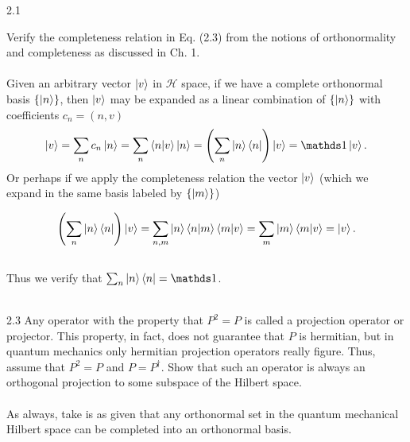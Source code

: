 \documentclass[10pt,letterpaper]{article}
\begin{document}
	\item[2.1]
	
	Verify the completeness relation in Eq. (2.3) from the notions of orthonormality and completeness as discussed in 
	Ch. 1.\\ \\
	
	Given an arbitrary vector $\ket v$ in $\mathscr H$ space, if we have a complete orthonormal basis  $\{ \ket n\}$, 
	then $\ket v$ may be expanded as a linear combination of  $\{ \ket n\}$ with coefficients $c_n = (n,v)$
	\[
		\ket v = \sum_n c_n \ket n = \sum_n \braket{n|v}\ket n =\plr{ \sum_n {\ket n\bra n}}\ket v = \mathds 1 \ket v.
	\]
	 Or perhaps if we apply the completeness relation the vector $\ket v$ (which we expand in the same basis 
	 labeled by $\{\ket m\}$)
	 
	\[
		\left(\sum_n \ket n\bra n\right) \ket v = \sum_{n,m} \ket n \braket{n|m}\braket{m|v} = \sum_m \ket m\braket{m|v} 
		=\ket v.
	\]
	\\
	Thus we verify that $\sum_n \ket n\bra n = \mathds 1$. 
	\\ \\
	\item[2.3]
	Any operator with the property that $P^2 = P$ is called a projection operator or projector. This property, in fact, 
	does not guarantee that $P$ is hermitian, but in quantum mechanics only hermitian projection operators
	really figure. Thus, assume that $P^2 = P$ and $P = P^\dag$. Show that such an operator is always an
	orthogonal projection to some subspace of the Hilbert space. \\ \\
	As always, take is as given that any orthonormal set in the quantum mechanical Hilbert space can be completed
	into an orthonormal basis. \\ \\ \\
	
\end{document}
